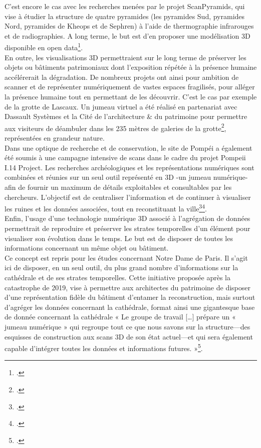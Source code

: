 C'est encore le cas avec les recherches menées par le projet ScanPyramids, qui vise à étudier la structure de quatre pyramides (les pyramides Sud, pyramides Nord, pyramides de Kheops et de Sephren) à l'aide de thermographie infrarouges et de radiographies. A long terme, le but est d'en proposer une modélisation 3D disponible en open data\footcite{ScanPyramids}.\\

En outre, les visualisations 3D permettraient sur le long terme de préserver les objets ou bâtiments patrimoniaux dont l'exposition répétée à la présence humaine accélérerait la dégradation. De nombreux projets ont ainsi pour ambition de scanner et de représenter numériquement de vastes espaces fragilisés, pour alléger la présence humaine tout en permettant de les découvrir. C'est le cas par exemple de la grotte de Lascaux. Un jumeau virtuel a été réalisé en partenariat avec Dassault Systèmes et la Cité de l'architecture \& du patrimoine pour permettre aux visiteurs de déambuler dans les 235 mètres de galeries de la grotte\footcite{VisiteGrotteLascaux}, représentées en grandeur nature.\\ 

Dans une optique de recherche et de conservation, le site de Pompéi a également été soumis à une campagne intensive de scans dans le cadre du projet Pompeii I.14 Project. Les recherches archéologiques et les représentations numériques sont combinées et réunies sur un seul outil représenté en 3D -un jumeau numérique- afin de fournir un maximum de détails exploitables et consultables par les chercheurs. L'objectif est de centraliser l'information et de continuer à visualiser les ruines et les données associées, tout en reconstituant la ville\footcite{Pompeii14Project}\footcite{ModelingPompeiiNew2023}.\\

Enfin, l’usage d’une technologie numérique 3D associé à l’agrégation de données permettrait de reproduire et préserver les strates temporelles d’un élément pour visualiser son évolution dans le temps. Le but est de disposer de toutes les informations concernant un même objet ou bâtiment.\\

Ce concept est repris pour les études concernant Notre Dame de Paris. Il s'agit ici de disposer, en un seul outil, du plus grand nombre d'informations sur la cathédrale et de ses strates temporelles. Cette initiative proposée après la catastrophe de 2019,  vise à permettre aux architectes du patrimoine de disposer d'une représentation fidèle du bâtiment d'entamer la reconstruction, mais surtout d'agréger les données concernant la cathédrale, format ainsi une gigantesque base de donnée concernant la cathédrale « Le groupe de travail [\dots] prépare un « jumeau numérique » qui regroupe tout ce que nous savons sur la structure—des esquisses de construction aux scans 3D de son état actuel—et qui sera également capable d'intégrer toutes les données et informations futures. »\footcite{veyrierasDigitalTwinNotreDame2019}.

